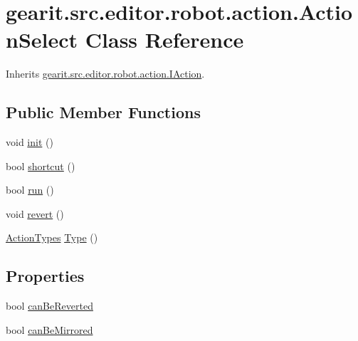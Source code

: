 \hypertarget{classgearit_1_1src_1_1editor_1_1robot_1_1action_1_1_action_select}{\section{gearit.\+src.\+editor.\+robot.\+action.\+Action\+Select Class Reference}
\label{classgearit_1_1src_1_1editor_1_1robot_1_1action_1_1_action_select}
}


Inherits \hyperlink{interfacegearit_1_1src_1_1editor_1_1robot_1_1action_1_1_i_action}{gearit.\+src.\+editor.\+robot.\+action.\+I\+Action}.

\subsection*{Public Member Functions}
\begin{DoxyCompactItemize}
\item 
void \hyperlink{classgearit_1_1src_1_1editor_1_1robot_1_1action_1_1_action_select_a27668a43c2b5113a382a80799043dc50}{init} ()
\item 
bool \hyperlink{classgearit_1_1src_1_1editor_1_1robot_1_1action_1_1_action_select_a62f74750bafde95effc04981d4b6665a}{shortcut} ()
\item 
bool \hyperlink{classgearit_1_1src_1_1editor_1_1robot_1_1action_1_1_action_select_a33f7bcab79c74eba8e6fbfe226c354b5}{run} ()
\item 
void \hyperlink{classgearit_1_1src_1_1editor_1_1robot_1_1action_1_1_action_select_a9c9b7ed5845dd828f71df4f1a1c52bff}{revert} ()
\item 
\hyperlink{namespacegearit_1_1src_1_1editor_1_1robot_1_1action_a4be0fd46e3952d6135136b20e7b3fc5e}{Action\+Types} \hyperlink{classgearit_1_1src_1_1editor_1_1robot_1_1action_1_1_action_select_a91715968ab096458bd324592cc9e6920}{Type} ()
\end{DoxyCompactItemize}
\subsection*{Properties}
\begin{DoxyCompactItemize}
\item 
bool \hyperlink{classgearit_1_1src_1_1editor_1_1robot_1_1action_1_1_action_select_a59d23b90805e4d9a013203f08d95780c}{can\+Be\+Reverted}
\item 
bool \hyperlink{classgearit_1_1src_1_1editor_1_1robot_1_1action_1_1_action_select_acd1e38ed74fc37f392c342ee880c5512}{can\+Be\+Mirrored}
\end{DoxyCompactItemize}


